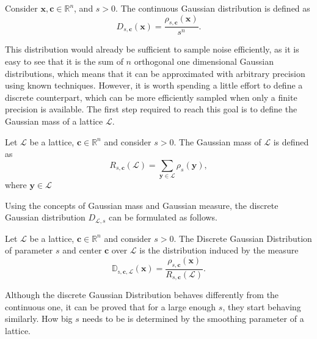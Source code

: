 \begin{definition}
Consider $\mathbf{x},\mathbf{c}\in\mathbb{R}^n$, and $s>0$. The continuous Gaussian distribution is defined as
\begin{equation*}
D_{s,\mathbf{c}}(\mathbf{x})=\frac{\rho_{s,\mathbf{c}}(\mathbf{x})}{s^n}.
\end{equation*}
\end{definition}

This distribution would already be sufficient to sample noise efficiently, as it is easy to see that it is the sum of $n$ orthogonal one dimensional Gaussian distributions, which means that it can be approximated with arbitrary precision using known techniques. However, it is worth spending a little effort to define a discrete counterpart, which can be more efficiently sampled when only a finite precision is available. The first step required to reach this goal is to define the Gaussian mass of a lattice $\mathscr{L}$.

\begin{definition}
Let $\mathscr{L}$ be a lattice, $\mathbf{c}\in\mathbb{R}^n$ and consider $s>0$. The Gaussian mass of $\mathscr{L}$ is defined as
\begin{equation*}
R_{s,\mathbf{c}}(\mathscr{L})=\sum_{\mathbf{y}\in\mathscr{L}}\rho_s(\mathbf{y}),
\end{equation*}
where $\mathbf{y}\in\mathscr{L}$
\end{definition}

Using the concepts of Gaussian mass and Gaussian measure, the discrete Gaussian distribution $D_{\mathscr{L},s}$ can be formulated as follows.

\begin{definition}
Let $\mathscr{L}$ be a lattice, $\mathbf{c}\in\mathbb{R}^n$ and consider $s>0$. The Discrete Gaussian Distribution of parameter $s$ and center $\mathbf{c}$ over $\mathscr{L}$ is the distribution induced by the measure
\begin{equation*}
\mathbb{D_{s,\mathbf{c},\mathscr{L}}}(\mathbf{x})= \frac{\rho_{s,\mathbf{c}}(\mathbf{x})}{R_{s,\mathbf{c}}(\mathscr{L})}.
\end{equation*}
\end{definition}

\begin{remark}
Although the discrete Gaussian Distribution behaves differently from the continuous one, it can be proved that for a large enough $s$, they start behaving similarly. How big $s$ needs to be is determined by the smoothing parameter of a lattice.
\end{remark}

